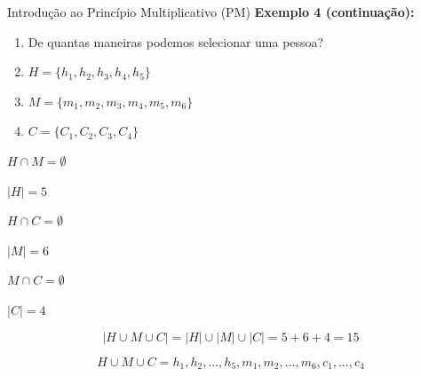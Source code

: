 \documentclass[aspectratio=169]{beamer}
\begin{document}
\begin{frame}{Introdução ao Princípio Multiplicativo (PM)}
    \textbf{Exemplo 4 (continuação):}

    \vspace{2mm}
        \begin{enumerate}[a]
                \item De quantas maneiras podemos selecionar uma pessoa?
                \item[] $H = \{ h_1, h_2, h_3, h_4, h_5 \}$
                \item[] $M = \{ m_1, m_2, m_3, m_4, m_5, m_6 \}$
                \item[] $C = \{ C_1, C_2, C_3, C_4 \}$
        \end{enumerate}

    \vspace{2mm}
    \begin{center}
        \begin{multicols}{3}
            $H \cap M = \emptyset $

            $|H|=5$

            \columnbreak

            $H \cap C = \emptyset $

            $|M| = 6 $

            \columnbreak

            $M \cap C = \emptyset$

            $|C| = 4$

        \end{multicols}
    \end{center}

    $$|H \cup M \cup C| = |H| \cup |M| \cup |C| = 5 + 6 + 4 = 15$$

    $$H \cup M \cup C = { h_1, h_2, ..., h_5, m_1, m_2, ..., m_6, c_1, ..., c_4}$$

\end{frame}
\end{document}
